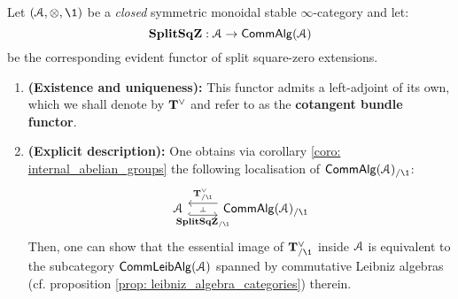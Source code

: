                     \begin{lemma} \label{lemma: cotangent_bundles} 
                        Let $(\calA, \tensor, \1)$ be a \textit{closed} symmetric monoidal stable $\infty$-category and let:
                            $$\mathbf{Split}\mathbf{Sq}\mathbf{Z}: \mathcal{A} \to \mathsf{Comm}\mathsf{Alg}(\mathcal{A})$$
                        be the corresponding evident functor of split square-zero extensions.
                            \begin{enumerate}
                                \item \textbf{(Existence and uniqueness):} This functor admits a left-adjoint of its own, which we shall denote by $\mathbf{T}^{\vee}$ and refer to as the \textbf{cotangent bundle functor}.
                                \item \textbf{(Explicit description):} One obtains via corollary \ref{coro: internal_abelian_groups} the following localisation of $\Comm\Alg(\calA)_{/\1}$:
                                    $$
                                        \begin{tikzcd}
                                        	\calA & {\Comm\Alg(\calA)_{/\1}}
                                        	\arrow[""{name=0, anchor=center, inner sep=0}, "\Split\SqZ_{/\1}"', shift right=2, hook, from=1-1, to=1-2]
                                        	\arrow[""{name=1, anchor=center, inner sep=0}, "{\bfT^{\vee}_{/\1}}"', shift right=2, from=1-2, to=1-1]
                                        	\arrow["\dashv"{anchor=center, rotate=-90}, draw=none, from=1, to=0]
                                        \end{tikzcd}
                                    $$
                                Then, one can show that the essential image of $\bfT^{\vee}_{/\1}$ inside $\mathcal{A}$ is equivalent to the subcategory $\mathsf{Comm}\mathsf{Leib}\mathsf{Alg}(\mathcal{A})$ spanned by commutative Leibniz algebras (cf. proposition \ref{prop: leibniz_algebra_categories}) therein.
                            \end{enumerate}
                    \end{lemma}
